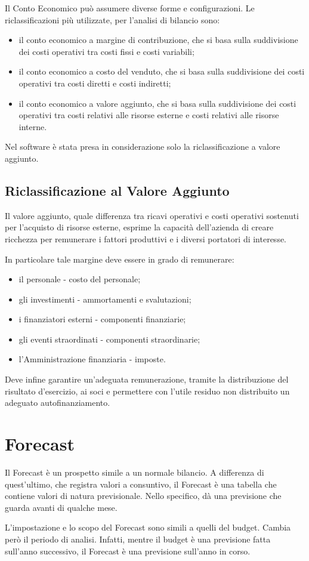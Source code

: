 Il Conto Economico può assumere diverse forme e configurazioni. Le riclassificazioni più utilizzate, per l’analisi di bilancio sono:
\begin{itemize}
\item il conto economico a margine di contribuzione, che si basa sulla suddivisione dei costi operativi tra costi fissi e costi variabili;
\item il conto economico a costo del venduto, che si basa sulla suddivisione dei costi operativi tra costi diretti e costi indiretti;
\item il conto economico a valore aggiunto, che si basa sulla suddivisione dei costi operativi tra costi relativi alle risorse esterne e costi relativi alle risorse interne.
 \end{itemize}

Nel software è stata presa in considerazione solo la riclassificazione a valore aggiunto.


\subsection{Riclassificazione al Valore Aggiunto}

Il valore aggiunto, quale differenza tra ricavi operativi e costi operativi sostenuti per l’acquisto di risorse esterne, esprime la capacità dell’azienda di creare ricchezza per remunerare i fattori produttivi e i diversi portatori di interesse.

In particolare tale margine deve essere in grado di remunerare:
\begin{itemize}
\item il personale - costo del personale;
\item gli investimenti - ammortamenti e svalutazioni;
\item i finanziatori esterni - componenti finanziarie;
\item gli eventi straordinati - componenti straordinarie;
\item l’Amministrazione finanziaria - imposte.
\end{itemize}

Deve infine garantire un’adeguata remunerazione, tramite la distribuzione del risultato d’esercizio, ai soci e permettere con l’utile residuo non distribuito un adeguato autofinanziamento.



\section{Forecast}

Il Forecast è un prospetto simile a un normale bilancio. A differenza di quest’ultimo, che registra valori a consuntivo, il Forecast è una tabella che contiene valori di natura previsionale. Nello specifico, dà una previsione che guarda avanti di qualche mese.

L’impostazione e lo scopo del Forecast sono simili a quelli del budget. Cambia però il periodo di analisi. Infatti, mentre il budget è una previsione fatta sull’anno successivo, il Forecast è una previsione sull’anno in corso.

